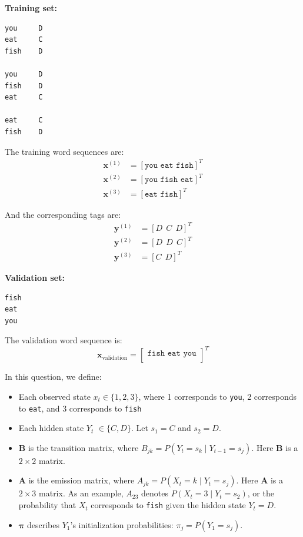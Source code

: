 \documentclass[11pt,addpoints,answers]{exam}
\begin{document}
\begin{questions}
\textbf{Training set:} 
\begin{verbatim}
you     D
eat     C
fish    D

you     D
fish    D
eat     C

eat     C
fish    D
\end{verbatim}

The training word sequences are:
\begin{align*}
    \mathbf{x}^{(1)} &= [\texttt{you eat fish}]^T \\
    \mathbf{x}^{(2)} &= [\texttt{you fish eat}]^T \\
    \mathbf{x}^{(3)} &= [\texttt{eat fish}]^T 
\end{align*}

And the corresponding tags are:
\begin{align*}
    \mathbf{y}^{(1)} &= [D~~C~~D]^T \\
    \mathbf{y}^{(2)} &= [D~~D~~C]^T \\
    \mathbf{y}^{(3)} &= [C~~D]^T
\end{align*}

\textbf{Validation set:}
\begin{verbatim}
fish
eat
you
\end{verbatim}

The validation word sequence is: 
$$
\mathbf{x}_{\text{validation}}= 
\begin{bmatrix}
\texttt{fish eat you}\\
\end{bmatrix}^T
$$

\clearpage
In this question, we define:
\begin{itemize}
    \item Each observed state $x_t \in \{1,2,3\}$, where 1 corresponds to \texttt{you}, 2 corresponds to \texttt{eat}, and 3 corresponds to \texttt{fish}
    \item Each hidden state $Y_t$ $\in \{C,D\}$. Let $s_1 = C$ and $s_2 = D$.
    \item $\mathbf{B}$ is the transition matrix, where $B_{jk} = P(Y_{t} = s_{k} \mid Y_{t-1} = s_{j})$. Here $\mathbf{B}$ is a $2 \times 2$ matrix. 
    \item $\mathbf{A}$ is the emission matrix, where $A_{jk} = P(X_{t} = k \mid Y_{t} = s_{j})$. Here $\mathbf{A}$ is a $2 \times 3$ matrix. As an example, $A_{23}$ denotes $P(X_{t} = 3 \mid Y_{t} = s_{2})$, or the probability that $X_{t}$ corresponds to \texttt{fish} given the hidden state $Y_t = D$.
    \item $\boldsymbol{\pi}$ describes $Y_1$'s initialization probabilities: $\pi_j = P(Y_1 = s_j)$.
    

\end{itemize}
\end{questions}
\end{document}
